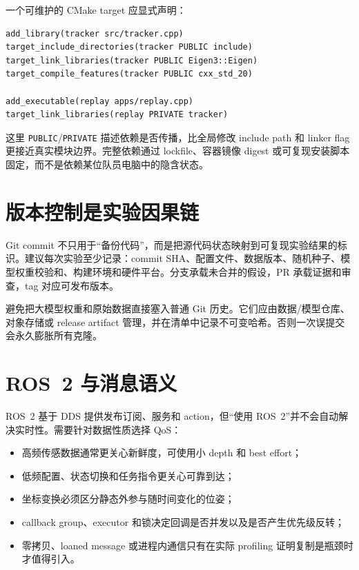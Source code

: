 一个可维护的 CMake target 应显式声明：

\begin{lstlisting}[language={}]
add_library(tracker src/tracker.cpp)
target_include_directories(tracker PUBLIC include)
target_link_libraries(tracker PUBLIC Eigen3::Eigen)
target_compile_features(tracker PUBLIC cxx_std_20)

add_executable(replay apps/replay.cpp)
target_link_libraries(replay PRIVATE tracker)
\end{lstlisting}

这里 \texttt{PUBLIC}/\texttt{PRIVATE} 描述依赖是否传播，比全局修改 include path 和 linker flag 更接近真实模块边界。完整依赖通过 lockfile、容器镜像 digest 或可复现安装脚本固定，而不是依赖某位队员电脑中的隐含状态。

\section{版本控制是实验因果链}

Git commit 不只用于“备份代码”，而是把源代码状态映射到可复现实验结果的标识。建议每次实验至少记录：commit SHA、配置文件、数据版本、随机种子、模型权重校验和、构建环境和硬件平台。分支承载未合并的假设，PR 承载证据和审查，tag 对应可发布版本。

避免把大模型权重和原始数据直接塞入普通 Git 历史。它们应由数据/模型仓库、对象存储或 release artifact 管理，并在清单中记录不可变哈希。否则一次误提交会永久膨胀所有克隆。

\section{ROS~2 与消息语义}

ROS~2 基于 DDS 提供发布订阅、服务和 action，但“使用 ROS~2”并不会自动解决实时性。需要针对数据性质选择 QoS：

\begin{itemize}
  \item 高频传感数据通常更关心新鲜度，可使用小 depth 和 best effort；
  \item 低频配置、状态切换和任务指令更关心可靠到达；
  \item 坐标变换必须区分静态外参与随时间变化的位姿；
  \item callback group、executor 和锁决定回调是否并发以及是否产生优先级反转；
  \item 零拷贝、loaned message 或进程内通信只有在实际 profiling 证明复制是瓶颈时才值得引入。
\end{itemize}

